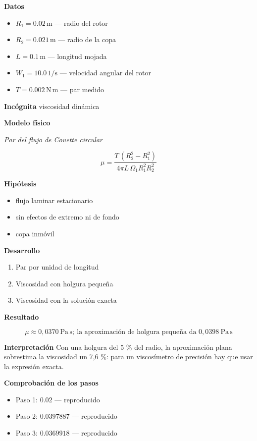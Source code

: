 \documentclass[10pt,openany]{book}
\begin{document}
\noindent\textbf{Datos}
\begin{itemize}
\item $R_{1} = 0.02\,\mathrm{m}$ — radio del rotor
\item $R_{2} = 0.021\,\mathrm{m}$ — radio de la copa
\item $L = 0.1\,\mathrm{m}$ — longitud mojada
\item $W_{1} = 10.0\,\mathrm{1/s}$ — velocidad angular del rotor
\item $T = 0.002\,\mathrm{N}\,\mathrm{m}$ — par medido
\end{itemize}

\noindent\textbf{Incógnita}
viscosidad dinámica

\noindent\textbf{Modelo físico}

\noindent\textit{Par del flujo de Couette circular}

\[
\mu = \frac{T\,(R_2^{2} - R_1^{2})}{4\pi L\,\Omega_1 R_1^{2}R_2^{2}}
\]

\noindent\textbf{Hipótesis}
\begin{itemize}
\item flujo laminar estacionario
\item sin efectos de extremo ni de fondo
\item copa inmóvil
\end{itemize}

\noindent\textbf{Desarrollo}
\begin{enumerate}
\item
Par por unidad de longitud
\item
Viscosidad con holgura pequeña
\item
Viscosidad con la solución exacta
\end{enumerate}

\noindent\textbf{Resultado}

\[
\mu \approx 0{,}0370\ \mathrm{Pa\,s};\ \text{la aproximación de holgura pequeña da } 0{,}0398\ \mathrm{Pa\,s}
\]

\noindent\textbf{Interpretación}
Con una holgura del 5 \% del radio, la aproximación plana sobrestima la viscosidad un 7,6 \%: para un viscosímetro de precisión hay que usar la expresión exacta.

\noindent\textbf{Comprobación de los pasos}
\begin{itemize}
\item Paso 1: $0.02$ — reproducido
\item Paso 2: $0.0397887$ — reproducido
\item Paso 3: $0.0369918$ — reproducido
\end{itemize}
\end{document}
